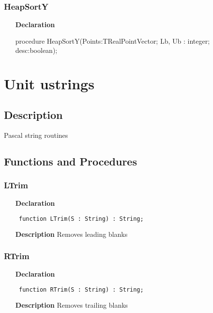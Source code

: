 \documentclass[12pt,a4paper,oneside]{report}
\newcommand{\declarationitem}[1]{\textbf{#1}}
\newcommand{\descriptiontitle}[1]{\textbf{#1}}
\newcommand{\code}[1]{\texttt{#1}}
\begin{document}
\subsubsection{HeapSortY}
\label{lmsorting-HeapSortY}
\begin{itemize}\item[\declarationitem{Declaration}\hfill]
	\begin{flushleft}
		\begin{ttfamily}
			procedure HeapSortY(Points:TRealPointVector; Lb, Ub : integer; desc:boolean);\end{ttfamily}
		
	\end{flushleft}
\end{itemize}
\section{Unit ustrings}
\label{ustrings}
\subsection{Description}
Pascal string routines 
\subsection{Functions and Procedures}
\subsubsection{LTrim}
\label{ustrings-LTrim}
\begin{itemize}\item[\declarationitem{Declaration}\hfill]
	\begin{flushleft}
		\code{
			function LTrim(S : String) : String;}
		
	\end{flushleft}
	
	\par
	\item[\descriptiontitle{Description}]
	Removes leading blanks
	
\end{itemize}
\subsubsection{RTrim}
\label{ustrings-RTrim}
\begin{itemize}\item[\declarationitem{Declaration}\hfill]
	\begin{flushleft}
		\code{
			function RTrim(S : String) : String;}
		
	\end{flushleft}
	
	\par
	\item[\descriptiontitle{Description}]
	Removes trailing blanks
	
\end{itemize}
\end{document}
